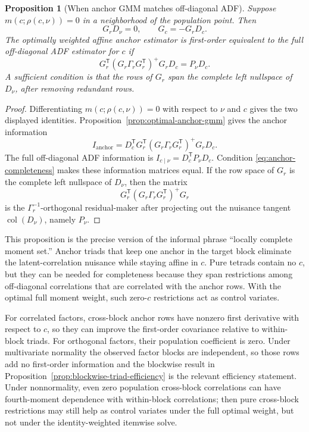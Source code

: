\documentclass[11pt]{article}
\newcommand{\T}{^{\mathsf T}}
\newcommand{\col}{\operatorname{col}}
\theoremstyle{plain}
\newtheorem{proposition}{Proposition}
\theoremstyle{remark}
\begin{document}
\begin{proposition}[When anchor GMM matches off-diagonal ADF]
\label{prop:anchor-adf}
Suppose \(m(c;\rho(c,\nu))=0\) in a neighborhood of the population point. Then
\[
  G_rD_\nu=0,
  \qquad
  G_c=-G_rD_c .
\]
The optimally weighted affine anchor estimator is first-order equivalent to the
full off-diagonal ADF estimator for \(c\) if
\begin{equation}\label{eq:anchor-completeness}
  G_r\T(G_r\Gamma_rG_r\T)^{+}G_rD_c
  =
  P_\nu D_c .
\end{equation}
A sufficient condition is that the rows of \(G_r\) span the complete left
nullspace of \(D_\nu\), after removing redundant rows.
\end{proposition}

\begin{proof}
Differentiating \(m(c;\rho(c,\nu))=0\) with respect to \(\nu\) and \(c\) gives
the two displayed identities. Proposition~\ref{prop:optimal-anchor-gmm} gives
the anchor information
\[
  I_{\mathrm{anchor}}
  =
  D_c\T G_r\T(G_r\Gamma_rG_r\T)^{+}G_rD_c .
\]
The full off-diagonal ADF information is \(I_{c\mid\nu}=D_c\T P_\nu D_c\).
Condition \eqref{eq:anchor-completeness} makes these information matrices
equal. If the row space of \(G_r\) is the complete left nullspace of \(D_\nu\),
then the matrix
\[
  G_r\T(G_r\Gamma_rG_r\T)^{+}G_r
\]
is the \(\Gamma_r^{-1}\)-orthogonal residual-maker after projecting out the
nuisance tangent \(\col(D_\nu)\), namely \(P_\nu\).
\end{proof}

This proposition is the precise version of the informal phrase ``locally
complete moment set.'' Anchor triads that keep one anchor in the target block
eliminate the latent-correlation nuisance while staying affine in \(c\). Pure
tetrads contain no \(c\), but they can be needed for completeness because they
span restrictions among off-diagonal correlations that are correlated with the
anchor rows. With the optimal full moment weight, such zero-\(c\) restrictions
act as control variates.

For correlated factors, cross-block anchor rows have nonzero first derivative
with respect to \(c\), so they can improve the first-order covariance relative
to within-block triads. For orthogonal factors, their population coefficient is
zero. Under multivariate normality the observed factor blocks are independent,
so those rows add no first-order information and the blockwise result in
Proposition~\ref{prop:blockwise-triad-efficiency} is the relevant efficiency
statement. Under nonnormality, even zero population cross-block correlations
can have fourth-moment dependence with within-block correlations; then pure
cross-block restrictions may still help as control variates under the full
optimal weight, but not under the identity-weighted itemwise solve.
\end{document}
